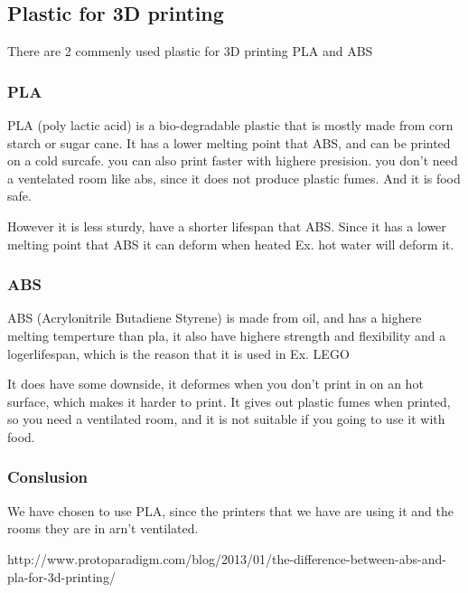 \subsection{Plastic for 3D printing}
There are 2 commenly used plastic for 3D printing PLA and ABS

\subsubsection{PLA}
PLA (poly lactic acid) is a bio-degradable plastic that is mostly made from corn starch or sugar cane.
It has a lower melting point that ABS, and can be printed on a cold surcafe. you can also print faster with highere presision. you don't need a ventelated room like abs, since it does not produce plastic fumes. And it is food safe.

However it is less sturdy, have a shorter lifespan that ABS. Since it has a lower melting point that ABS it can deform when heated Ex. hot water will deform it.

\subsubsection{ABS}
ABS (Acrylonitrile Butadiene Styrene) is made from oil, and has a highere melting temperture than pla, it also have highere strength and flexibility and a logerlifespan, which is the reason that it is used in Ex. LEGO

It does have some downside, it deformes when you don't print in on an hot surface, which makes it harder to print. It gives out plastic fumes when printed, so you need a ventilated room, and it is not suitable if you going to use it with food.

\subsubsection{Conslusion}
We have chosen to use PLA, since the printers that we have are using it and the rooms they are in arn't ventilated.

http://www.protoparadigm.com/blog/2013/01/the-difference-between-abs-and-pla-for-3d-printing/